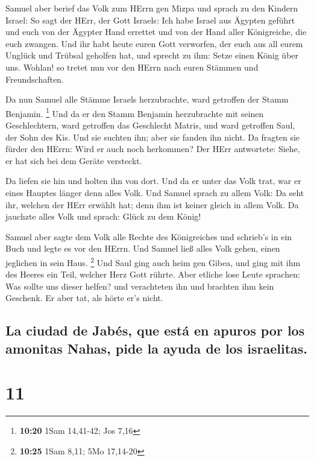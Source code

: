  Samuel aber berief das Volk zum HErrn gen Mizpa
 und sprach zu den Kindern Israel: So sagt der HErr, der
Gott Israels: Ich habe Israel aus Ägypten geführt und euch von der
Ägypter Hand errettet und von der Hand aller Königreiche, die euch
zwangen.  Und ihr habt heute euren Gott verworfen, der
euch aus all eurem Unglück und Trübsal geholfen hat, und sprecht zu ihm:
Setze einen König über uns. Wohlan! so tretet nun vor den HErrn nach
euren Stämmen und Freundschaften.

 Da nun Samuel alle Stämme Israels herzubrachte, ward
getroffen der Stamm Benjamin. \footnote{\textbf{10:20} 1Sam 14,41-42;
  Jos 7,16}  Und da er den Stamm Benjamin herzubrachte
mit seinen Geschlechtern, ward getroffen das Geschlecht Matris, und ward
getroffen Saul, der Sohn des Kis. Und sie suchten ihn; aber sie fanden
ihn nicht.  Da fragten sie fürder den HErrn: Wird er auch
noch herkommen? Der HErr antwortete: Siehe, er hat sich bei dem Geräte
versteckt.

 Da liefen sie hin und holten ihn von dort. Und da er
unter das Volk trat, war er eines Hauptes länger denn alles Volk.
 Und Samuel sprach zu allem Volk: Da seht ihr, welchen
der HErr erwählt hat; denn ihm ist keiner gleich in allem Volk. Da
jauchzte alles Volk und sprach: Glück zu dem König!

 Samuel aber sagte dem Volk alle Rechte des Königreiches
und schrieb's in ein Buch und legte es vor den HErrn. Und Samuel ließ
alles Volk gehen, einen jeglichen in sein Haus. \footnote{\textbf{10:25}
  1Sam 8,11; 5Mo 17,14-20}  Und Saul ging auch heim gen
Gibea, und ging mit ihm des Heeres ein Teil, welcher Herz Gott rührte.
 Aber etliche lose Leute sprachen: Was sollte uns dieser
helfen? und verachteten ihn und brachten ihm kein Geschenk. Er aber tat,
als hörte er's nicht.

\hypertarget{la-ciudad-de-jabuxe9s-que-estuxe1-en-apuros-por-los-amonitas-nahas-pide-la-ayuda-de-los-israelitas.}{%
\subsection{La ciudad de Jabés, que está en apuros por los amonitas
Nahas, pide la ayuda de los
israelitas.}\label{la-ciudad-de-jabuxe9s-que-estuxe1-en-apuros-por-los-amonitas-nahas-pide-la-ayuda-de-los-israelitas.}}

\hypertarget{section-10}{%
\section{11}\label{section-10}}

